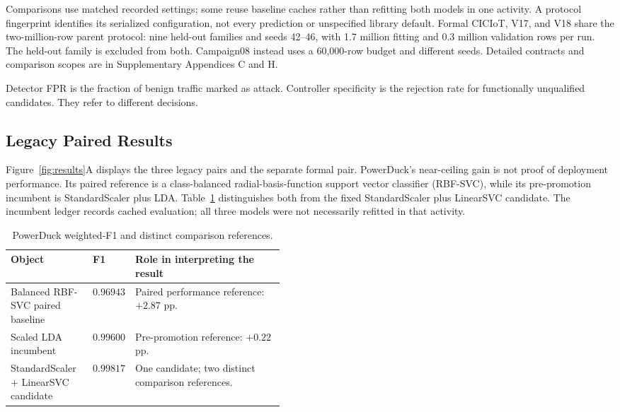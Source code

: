 \documentclass[sigconf]{acmart}
\begin{document}
Comparisons use matched recorded settings; some reuse baseline caches
rather than refitting both models in one activity. A protocol fingerprint
identifies its serialized configuration, not every prediction or
unspecified library default. Formal CICIoT, V17, and V18 share the
two-million-row parent protocol: nine held-out families and seeds 42--46,
with 1.7 million fitting and 0.3 million validation rows per run. The
held-out family is excluded from both. Campaign08 instead uses a
60,000-row budget and different seeds. Detailed contracts and comparison
scopes are in Supplementary Appendices C and H.

Detector FPR is the fraction of benign traffic marked as attack.
Controller specificity is the rejection rate for functionally unqualified
candidates. They refer to different decisions.

\subsection{Legacy Paired Results}
\label{sec:legacy}

Figure~\ref{fig:results}A displays the three legacy pairs and the separate
formal pair. PowerDuck's near-ceiling gain is not proof of deployment
performance. Its paired reference is a class-balanced radial-basis-function
support vector classifier (RBF-SVC), while its pre-promotion incumbent is
StandardScaler plus LDA. Table~\ref{tab:powerduck-comparators} distinguishes
both from the fixed StandardScaler plus LinearSVC candidate. The incumbent
ledger records cached evaluation; all three models were not necessarily
refitted in that activity.

\begin{table}[t]
\caption{PowerDuck weighted-F1 and distinct comparison references.}
\label{tab:powerduck-comparators}
\centering
\begin{tabularx}{\linewidth}{>{\raggedright\arraybackslash}p{0.30\linewidth}>{\centering\arraybackslash}p{0.15\linewidth}>{\raggedright\arraybackslash}X}
\toprule
\textbf{Object} & \textbf{F1} & \textbf{Role in interpreting the result} \\
\midrule
Balanced RBF-SVC paired baseline & $0.96943$ & Paired performance reference: $+2.87$ pp. \\
Scaled LDA incumbent & $0.99600$ & Pre-promotion reference: $+0.22$ pp. \\
StandardScaler + LinearSVC candidate & $0.99817$ & One candidate; two distinct comparison references. \\
\bottomrule
\end{tabularx}
\end{table}
\end{document}
